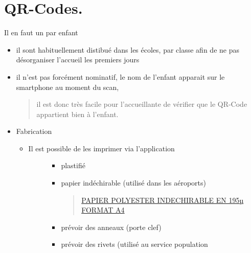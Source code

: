 \documentclass[letterpaper,10pt,english]{sphinxmanual}
\begin{document}
\section{QR-Codes.}
\label{checklist:qr-codes}
Il en faut un par enfant
\begin{itemize}
\item {} 
il sont habituellement distibué dans les écoles, par classe afin de ne pas désorganiser l'accueil les premiers jours

\item {} 
il n'est pas forcément nominatif, le nom de l'enfant apparait sur le smartphone au moment du scan,
\begin{quote}

il est donc très facile pour l'accueillante de vérifier que le QR-Code appartient bien à l'enfant.
\end{quote}

\item {} 
Fabrication
\begin{itemize}
\item {} \begin{description}
\item[{Il est possible de les imprimer via l'application}] \leavevmode\begin{itemize}
\item {} 
plastifié

\item {} 
papier indéchirable (utilisé dans les aéroports)
\begin{quote}

\href{https://www.google.be/search?q=PAPIER+POLYESTER+INDECHIRABLE+EN+195\%C2\%B5+FORMAT+A4}{PAPIER POLYESTER INDECHIRABLE EN 195µ FORMAT A4}
\end{quote}

\item {} 
prévoir des anneaux (porte clef)

\item {} 
prévoir des rivets (utilisé au service population

\end{itemize}

\end{description}

\end{itemize}

\end{itemize}
\end{document}
